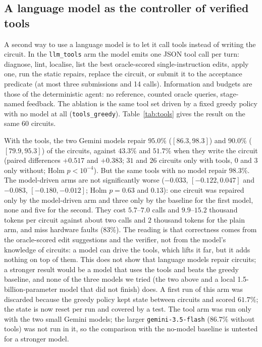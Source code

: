 \documentclass[journal]{IEEEtran}
\begin{document}
\subsection{A language model as the controller of verified tools}

A second way to use a language model is to let it call tools instead of writing the circuit. In the
\texttt{llm\_tools} arm the model emits one JSON tool call per turn: diagnose, lint, localise, list the best
oracle-scored single-instruction edits, apply one, run the static repairs, replace the circuit, or submit it to the acceptance
predicate (at most three submissions and 14 calls). Information and budgets are those of the deterministic agent: no
reference, counted oracle queries, stage-named feedback. The ablation is the same tool set driven by a fixed greedy policy
with no model at all (\texttt{tools\_greedy}). Table~\ref{tab:tools} gives the result on the same 60 circuits.



With the tools, the two Gemini models repair $95.0\%$ ($[86.3,98.3]$) and $90.0\%$ ($[79.9,95.3]$) of the circuits, against
$43.3\%$ and $51.7\%$ when they write the circuit (paired differences $+0.517$ and $+0.383$; $31$ and $26$ circuits only with
tools, $0$ and $3$ only without; Holm $p<10^{-4}$). But the same tools with no model repair $98.3\%$. The model-driven arms are
not significantly worse ($-0.033$, $[-0.122,0.047]$ and $-0.083$, $[-0.180,-0.012]$; Holm $p=0.63$ and $0.13$): one circuit was
repaired only by the model-driven arm and three only by the baseline for the first model, none and five for the second. They cost $5.7$--$7.0$ calls and
$9.9$--$15.2$ thousand tokens per circuit against about two calls and $2$ thousand tokens for the plain arm, and miss hardware
faults ($83\%$). The reading is that correctness comes from the oracle-scored edit suggestions and the verifier, not from the
model's knowledge of circuits: a model can drive the tools, which lifts it far, but it adds nothing on top of them. This does not
show that language models repair circuits; a stronger result would be a model that uses the tools and beats the greedy
baseline, and none of the three models we tried (the two above and a local 1.5-billion-parameter model that did not finish)
does. A first run of this arm was discarded because the greedy policy kept state between circuits and scored $61.7\%$; the
state is now reset per run and covered by a test. The tool arm was run only with the two small Gemini models; the larger
\texttt{gemini-3.5-flash} ($86.7\%$ without tools) was not run in it, so the comparison with the no-model baseline is untested for a stronger model.
\end{document}
